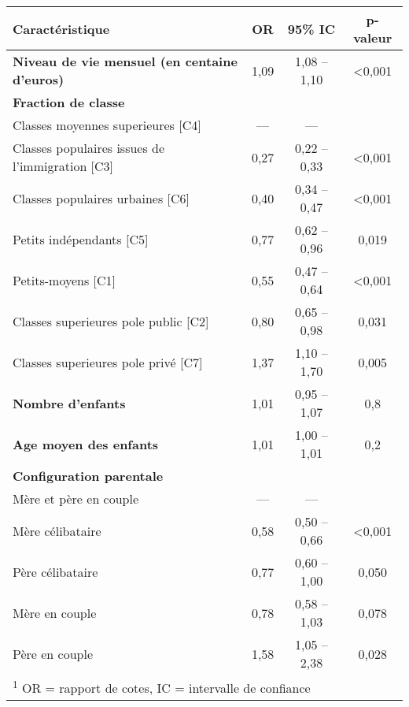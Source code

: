 \documentclass[
  12pt,
]{book}
\begin{document}
\begin{table}
\centering\begingroup\fontsize{8}{10}\selectfont

\begin{tabular}{lccc}
\toprule
\textbf{Caractéristique} & \textbf{OR} & \textbf{95\% IC} & \textbf{p-valeur}\\
\midrule
\textbf{Niveau de vie mensuel (en centaine d'euros)} & 1,09 & 1,08 – 1,10 & <0,001\\
\textbf{Fraction de classe} &  &  & \\
\hspace{1em}Classes moyennes superieures [C4] & — & — & \\
\hspace{1em}Classes populaires issues de l'immigration [C3] & 0,27 & 0,22 – 0,33 & <0,001\\
\hspace{1em}Classes populaires urbaines [C6] & 0,40 & 0,34 – 0,47 & <0,001\\
\addlinespace
\hspace{1em}Petits indépendants [C5] & 0,77 & 0,62 – 0,96 & 0,019\\
\hspace{1em}Petits-moyens [C1] & 0,55 & 0,47 – 0,64 & <0,001\\
\hspace{1em}Classes superieures pole public [C2] & 0,80 & 0,65 – 0,98 & 0,031\\
\hspace{1em}Classes superieures pole privé [C7] & 1,37 & 1,10 – 1,70 & 0,005\\
\textbf{Nombre d'enfants} & 1,01 & 0,95 – 1,07 & 0,8\\
\addlinespace
\textbf{Age moyen des enfants} & 1,01 & 1,00 – 1,01 & 0,2\\
\textbf{Configuration parentale} &  &  & \\
\hspace{1em}Mère et père en couple & — & — & \\
\hspace{1em}Mère célibataire & 0,58 & 0,50 – 0,66 & <0,001\\
\hspace{1em}Père célibataire & 0,77 & 0,60 – 1,00 & 0,050\\
\addlinespace
\hspace{1em}Mère en couple & 0,78 & 0,58 – 1,03 & 0,078\\
\hspace{1em}Père en couple & 1,58 & 1,05 – 2,38 & 0,028\\
\bottomrule
\multicolumn{4}{l}{\rule{0pt}{1em}\textsuperscript{1} OR = rapport de cotes, IC = intervalle de confiance}\\
\end{tabular}
\endgroup{}
\end{table}
\end{document}
